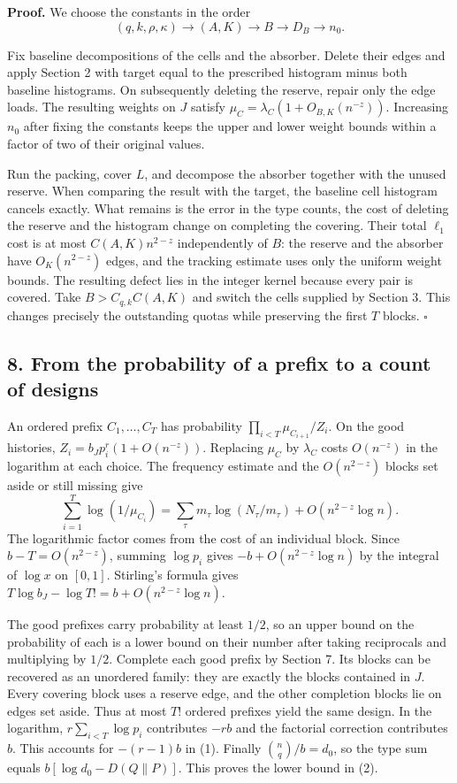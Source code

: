 \documentclass[english,11pt,a4paper]{article}
\begin{document}
\textbf{Proof.} We choose the constants in the order \[(q,k,\rho,\kappa)\longrightarrow(A,K)\longrightarrow B\longrightarrow D_B\longrightarrow n_0.\]

Fix baseline decompositions of the cells and the absorber. Delete their edges and apply Section 2 with target equal to the prescribed histogram minus both baseline histograms. On subsequently deleting the reserve, repair only the edge loads. The resulting weights on \(J\) satisfy \(\mu_C=\lambda_C(1+O_{B,K}(n^{-z}))\). Increasing \(n_0\) after fixing the constants keeps the upper and lower weight bounds within a factor of two of their original values.

Run the packing, cover \(L\), and decompose the absorber together with the unused reserve. When comparing the result with the target, the baseline cell histogram cancels exactly. What remains is the error in the type counts, the cost of deleting the reserve and the histogram change on completing the covering. Their total \(\ell_1\) cost is at most \(C(A,K)n^{2-z}\) independently of \(B\): the reserve and the absorber have \(O_K(n^{2-z})\) edges, and the tracking estimate uses only the uniform weight bounds. The resulting defect lies in the integer kernel because every pair is covered. Take \(B>C_{q,k}C(A,K)\) and switch the cells supplied by Section 3. This changes precisely the outstanding quotas while preserving the first \(T\) blocks. \(\square\)

\subsection{8. From the probability of a prefix to a count of designs}\label{from-the-probability-of-a-prefix-to-a-count-of-designs}

An ordered prefix \(C_1,\ldots,C_T\) has probability \(\prod_{i<T}\mu_{C_{i+1}}/Z_i\). On the good histories, \(Z_i=b_Jp_i^r(1+O(n^{-z}))\). Replacing \(\mu_C\) by \(\lambda_C\) costs \(O(n^{-z})\) in the logarithm at each choice. The frequency estimate and the \(O(n^{2-z})\) blocks set aside or still missing give \[\sum_{i=1}^T \log(1/\mu_{C_i})
 =\sum_\tau m_\tau\log(N_\tau/m_\tau)+O(n^{2-z}\log n).\] The logarithmic factor comes from the cost of an individual block. Since \(b-T=O(n^{2-z})\), summing \(\log p_i\) gives \(-b+O(n^{2-z}\log n)\) by the integral of \(\log x\) on \([0,1]\). Stirling's formula gives \(T\log b_J-\log T!=b+O(n^{2-z}\log n)\).

The good prefixes carry probability at least \(1/2\), so an upper bound on the probability of each is a lower bound on their number after taking reciprocals and multiplying by \(1/2\). Complete each good prefix by Section 7. Its blocks can be recovered as an unordered family: they are exactly the blocks contained in \(J\). Every covering block uses a reserve edge, and the other completion blocks lie on edges set aside. Thus at most \(T!\) ordered prefixes yield the same design. In the logarithm, \(r\sum_{i<T}\log p_i\) contributes \(-rb\) and the factorial correction contributes \(b\). This accounts for \(-(r-1)b\) in (1). Finally \(\binom nq/b=d_0\), so the type sum equals \(b[\log d_0-D(Q\|P)]\). This proves the lower bound in (2).
\end{document}
